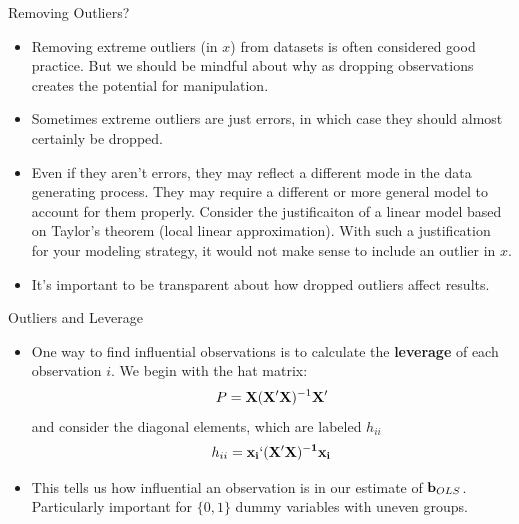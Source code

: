 \begin{frame}{Removing Outliers?}
\begin{itemize}
\item Removing extreme outliers (in $x$) from datasets is often considered good practice. But we should be mindful
		about why as dropping observations creates the potential for manipulation. 

	\medskip
	\item Sometimes extreme outliers are just errors, in which case they should almost certainly be dropped.

	\medskip
	\item Even if they aren't errors, they may reflect a different mode in the data generating process. They may require
		a different or more general model to account for them properly. Consider the justificaiton of a linear
		model based on Taylor's theorem (local linear approximation). With such a justification for your modeling
		strategy, it would not make sense to include an outlier in $x$.
	\medskip
	\item It's important to be transparent about how dropped outliers affect results. 

\end{itemize}
\end{frame}




\begin{frame}{Outliers and Leverage}
\begin{itemize}
\item One way to find influential observations is to calculate the {\bf leverage} of each observation $i$. We begin with the hat matrix:
\begin{align*}
P = {\bf X} ({\bf X} '{\bf X})^{-1}  {\bf X}'
\end{align*}
and consider the diagonal elements, which are labeled $h_{ii}$
\begin{align*}
h_{ii} = \bf{x}_i `({\bf X} '{\bf X})^{-1}  \bf{x}_i
\end{align*}

\medskip
\item This tells us how influential an observation is in our estimate of ${\bf b}_{OLS}$.\\
Particularly important for $\{0,1\}$ dummy variables with uneven groups.
\end{itemize}
\end{frame}



